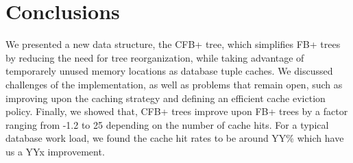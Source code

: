 \documentclass{article}
\begin{document}
\section{Conclusions}
We presented a new data structure, the CFB+ tree, which simplifies FB+ trees by reducing the need for tree reorganization,
while taking advantage of temporarely unused memory locations as database tuple caches.
We discussed challenges of the implementation, as well as problems that remain open,
such as improving upon the caching strategy and defining an efficient cache eviction policy.
Finally, we showed that, CFB+ trees improve upon FB+ trees by a factor ranging from -1.2 to 25 depending on the number of cache hits. For a typical database work load, we found the cache hit rates to be around YY\% which have us a YYx improvement.

\small



\end{document}
